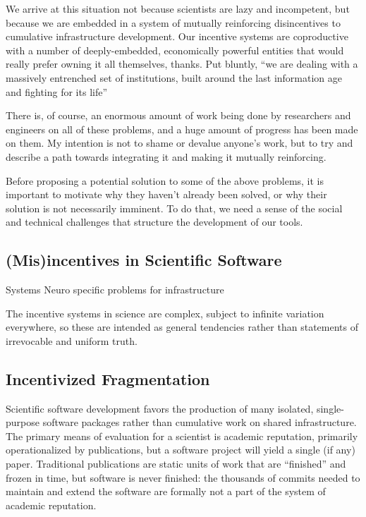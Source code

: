 \documentclass[10pt]{tufte-book}
\begin{document}
We arrive at this situation not because scientists are lazy and
incompetent, but because we are embedded in a system of mutually
reinforcing disincentives to cumulative infrastructure development. Our
incentive systems are coproductive with a number of deeply-embedded,
economically powerful entities that would really prefer owning it all
themselves, thanks. Put bluntly, ``we are dealing with a massively
entrenched set of institutions, built around the last information age
and fighting for its life'' \citep{bowkerInformationInfrastructureStudies2010} 

There is, of course, an enormous amount of work being done by
researchers and engineers on all of these problems, and a huge amount of
progress has been made on them. My intention is not to shame or devalue
anyone's work, but to try and describe a path towards integrating it and
making it mutually reinforcing.

Before proposing a potential solution to some of the above problems, it
is important to motivate why they haven't already been solved, or why
their solution is not necessarily imminent. To do that, we need a sense
of the social and technical challenges that structure the development of
our tools. 




\subsection{(Mis)incentives in Scientific
Software}

Systems Neuro {specific problems for infrastructure}



 The incentive systems in science are complex, subject to
infinite variation everywhere, so these are intended as general
tendencies rather than statements of irrevocable and uniform truth.


\subsection{Incentivized
Fragmentation}

Scientific software development favors the production of many isolated,
single-purpose software packages rather than cumulative work on shared
infrastructure. The primary means of evaluation for a scientist is
academic reputation, primarily operationalized by publications, but a
software project will yield a single (if any) paper. Traditional
publications are static units of work that are ``finished'' and frozen
in time, but software is never finished: the thousands of commits needed
to maintain and extend the software are formally not a part of the
system of academic reputation.
\end{document}
